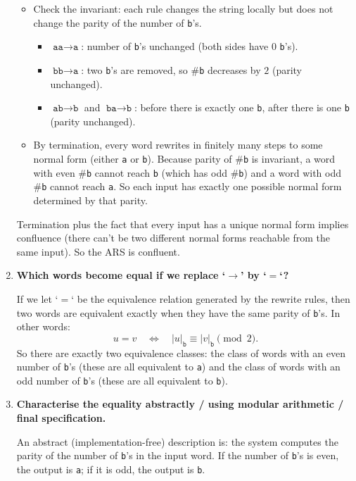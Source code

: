 \documentclass{article}
\theoremstyle{plain}
\theoremstyle{definition}
\theoremstyle{remark}
\begin{document}
\begin{enumerate}[label=(\alph*)]
  \begin{itemize}
    \item Check the invariant: each rule changes the string locally but does not change the parity of the number of \texttt{b}'s.
      \begin{itemize}
        \item $\texttt{aa}\to\texttt{a}$: number of \texttt{b}'s unchanged (both sides have 0 \texttt{b}'s).
        \item $\texttt{bb}\to\texttt{a}$: two \texttt{b}'s are removed, so \#\texttt{b} decreases by $2$ (parity unchanged).
        \item $\texttt{ab}\to\texttt{b}$ and $\texttt{ba}\to\texttt{b}$: before there is exactly one \texttt{b}, after there is one \texttt{b} (parity unchanged).
      \end{itemize}
    \item By termination, every word rewrites in finitely many steps to some normal form (either \texttt{a} or \texttt{b}). Because parity of \#\texttt{b} is invariant, a word with even \#\texttt{b} cannot reach \texttt{b} (which has odd \#\texttt{b}) and a word with odd \#\texttt{b} cannot reach \texttt{a}. So each input has exactly one possible normal form determined by that parity.
  \end{itemize}
  
  Termination plus the fact that every input has a unique normal form implies confluence (there can't be two different normal forms reachable from the same input). So the ARS is confluent.
  
  \item \textbf{Which words become equal if we replace `$\to$' by `$=$`?}
  
  If we let `$=$` be the equivalence relation generated by the rewrite rules, then two words are equivalent exactly when they have the same parity of \texttt{b}'s. In other words:
  \[
    u = v \quad\Longleftrightarrow\quad |u|_{\texttt{b}} \equiv |v|_{\texttt{b}} \pmod{2}.
  \]
  So there are exactly two equivalence classes: the class of words with an even number of \texttt{b}'s (these are all equivalent to \texttt{a}) and the class of words with an odd number of \texttt{b}'s (these are all equivalent to \texttt{b}).
  
  \item \textbf{Characterise the equality abstractly / using modular arithmetic / final specification.}
  
  An abstract (implementation-free) description is: the system computes the parity of the number of \texttt{b}'s in the input word. If the number of \texttt{b}'s is even, the output is \texttt{a}; if it is odd, the output is \texttt{b}.
  

\end{enumerate}
\end{document}
